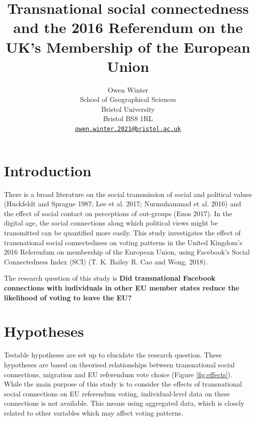 \documentclass{article}
\title{Transnational social connectedness and the 2016 Referendum on the
UK's Membership of the European Union}
\author{
    Owen Winter
   \\
    School of Geographical Sciences \\
    Bristol University \\
  Bristol BS8 1RL \\
  \texttt{\href{mailto:owen.winter.2021@bristol.ac.uk}{\nolinkurl{owen.winter.2021@bristol.ac.uk}}} \\
  }
\begin{document}
\maketitle


\begin{abstract}

\end{abstract}


\hypertarget{introduction}{%
\section{Introduction}\label{introduction}}

There is a broad literature on the social transmission of social and
political values (Huckfeldt and Sprague 1987; Lee et al. 2017;
Nurmuhammad et al. 2016) and the effect of social contact on perceptions
of out-groups (Enos 2017). In the digital age, the social connections
along which political views might be transmitted can be quantified more
easily. This study investigates the effect of transnational social
connectedness on voting patterns in the United Kingdom's 2016 Referenfum
on membership of the European Union, using Facebook's Social
Connectedness Index (SCI) (T. K. Bailey R. Cao and Wong. 2018).

The research question of this study is \textbf{Did transnational
Facebook connections with individuals in other EU member states reduce
the likelihood of voting to leave the EU?}

\hypertarget{hypotheses}{%
\section{Hypotheses}\label{hypotheses}}

Testable hypotheses are set up to elucidate the research question. These
hypotheses are based on theorised relationships between transnational
social connections, migration and EU referendum vote choice (Figure
\ref{fig:effects}). While the main purpose of this study is to consider
the effects of transnational social connections on EU referendum voting,
individual-level data on these connections is not available. This means
using aggregated data, which is closely related to other variables which
may affect voting patterns.
\end{document}
